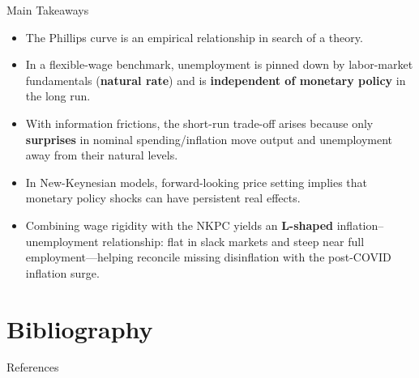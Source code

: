 \documentclass[11pt,aspectratio=169]{beamer}
\begin{document}
\begin{frame}{Main Takeaways}
\small
\begin{itemize}
  \item The Phillips curve is an empirical relationship in search of a theory.
  \item In a flexible-wage benchmark, unemployment is pinned down by labor-market fundamentals (\textbf{natural rate}) and is \textbf{independent of monetary policy} in the long run.
  \item With information frictions, the short-run trade-off arises because only \textbf{surprises} in nominal spending/inflation move output and unemployment away from their natural levels.
  \item In New-Keynesian models, forward-looking price setting implies that monetary policy shocks can have persistent real effects.
  \item Combining wage rigidity with the NKPC yields an \textbf{L-shaped} inflation--unemployment relationship: flat in slack markets and steep near full employment—helping reconcile missing disinflation with the post-COVID inflation surge.
\end{itemize}
\end{frame}

\section{Bibliography}

\begin{frame}[allowframebreaks]{References}
\printbibliography
\end{frame}
\end{document}

